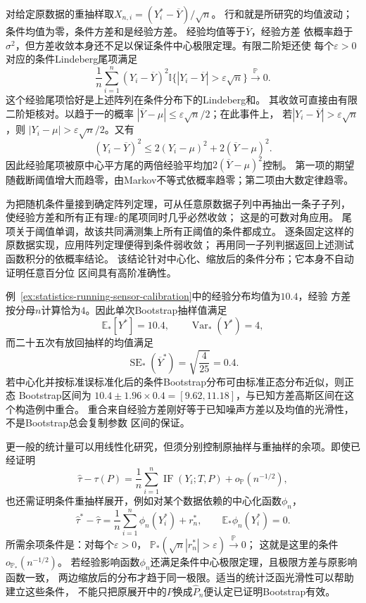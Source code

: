 对给定原数据的重抽样取\(X_{n,i}=(Y_i^\ast-\overline Y)/\sqrt n\)。
行和就是所研究的均值波动；条件均值为零，条件方差和是经验方差。
经验均值等于\(\overline Y\)，经验方差
依概率趋于\(\sigma^2\)，但方差收敛本身还不足以保证条件中心极限定理。有限二阶矩还使
每个\(\varepsilon>0\)对应的条件Lindeberg尾项满足
\[
  \frac1n\sum_{i=1}^n(Y_i-\overline Y)^2
  \mathbb I\{|Y_i-\overline Y|>\varepsilon\sqrt n\}
  \xrightarrow{\mathbb P}0.
\]
这个经验尾项恰好是上述阵列在条件分布下的Lindeberg和。
其收敛可直接由有限二阶矩核对。以趋于一的概率
\(|\overline Y-\mu|\leq\varepsilon\sqrt n/2\)；在此事件上，
若\(|Y_i-\overline Y|>\varepsilon\sqrt n\)，则
\(|Y_i-\mu|>\varepsilon\sqrt n/2\)。又有
\[
 (Y_i-\overline Y)^2\leq2(Y_i-\mu)^2+2(\overline Y-\mu)^2.
\]
因此经验尾项被原中心平方尾的两倍经验平均加\(2(\overline Y-\mu)^2\)控制。
第一项的期望随截断阈值增大而趋零，由Markov不等式依概率趋零；第二项由大数定律趋零。

为把随机条件量接到确定阵列定理，可从任意原数据子列中再抽出一条子子列，
使经验方差和所有正有理\(\varepsilon\)的尾项同时几乎必然收敛；
这是的可数对角应用。
尾项关于阈值单调，故该共同满测集上所有正阈值的条件都成立。
逐条固定这样的原数据实现，应用阵列定理便得到条件弱收敛；
再用同一子列判据返回上述测试函数积分的依概率结论。
该结论针对中心化、缩放后的条件分布；它本身不自动证明任意百分位
区间具有高阶准确性。

例~\ref{ex:statistics-running-sensor-calibration}中的经验分布均值为\(10.4\)，经验
方差按分母\(n\)计算恰为\(4\)。因此单次Bootstrap抽样值满足
\[
  \mathbb{E}_\ast[Y^\ast]=10.4,\qquad
  \operatorname{Var}_\ast(Y^\ast)=4,
\]
而二十五次有放回抽样的均值满足
\[
  \operatorname{SE}_\ast(\overline Y^\ast)
  =
  \sqrt{\frac4{25}}=0.4.
\]
若中心化并按标准误标准化后的条件Bootstrap分布可由标准正态分布近似，则正态
Bootstrap区间为
\(10.4\pm1.96\times0.4=[9.62,11.18]\)，与已知方差高斯区间在这个构造例中重合。
重合来自经验方差刚好等于已知噪声方差以及均值的光滑性，不是Bootstrap总会复制参数
区间的保证。

更一般的统计量可以用线性化研究，但须分别控制原抽样与重抽样的余项。即使已经证明
\[
  \widehat\tau-\tau(P)
  =
  \frac1n\sum_{i=1}^n\operatorname{IF}(Y_i;T,P)
  +o_{\mathbb{P}}(n^{-1/2}),
\]
也还需证明条件重抽样展开，例如对某个数据依赖的中心化函数\(\phi_n\)，
\[
 \widehat\tau^\ast-\widehat\tau
 =\frac1n\sum_{i=1}^n\phi_n(Y_i^\ast)+r_n^\ast,\qquad
 \mathbb E_\ast\phi_n(Y_i^\ast)=0.
\]
所需余项条件是：对每个\(\varepsilon>0\)，
\(\mathbb P_\ast(\sqrt n|r_n^\ast|>\varepsilon)\xrightarrow{\mathbb P}0\)；
这就是这里的条件\(o_{\mathbb P_\ast}(n^{-1/2})\)。
若经验影响函数\(\phi_n\)还满足条件中心极限定理，且极限方差与原影响函数一致，
两边缩放后的分布才趋于同一极限。适当的统计泛函光滑性可以帮助建立这些条件，
不能只把原展开中的\(P\)换成\(\widehat P_n\)便认定已证明Bootstrap有效。

